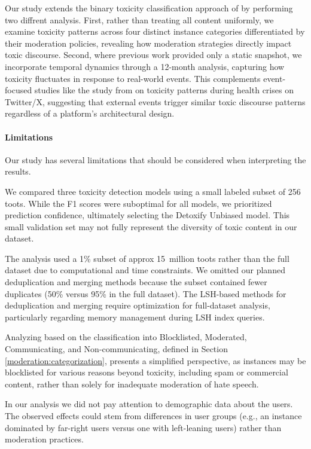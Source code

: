 Our study extends the binary toxicity classification approach of \citet{al-khateeb:2022} by performing two diffrent analysis. First, rather than treating all content uniformly, we examine toxicity patterns across four distinct instance categories differentiated by their moderation policies, revealing how moderation strategies directly impact toxic discourse. Second, where previous work provided only a static snapshot, we incorporate temporal dynamics through a 12-month analysis, capturing how toxicity fluctuates in response to real-world events. This complements event-focused studies like the study from \citet{fan:2022} on toxicity patterns during health crises on Twitter/X, suggesting that external events trigger similar toxic discourse patterns regardless of a platform's architectural design.

\paragraph{Limitations}
Our study has several limitations that should be considered when interpreting the results.

We compared three toxicity detection models using a small labeled subset of 256 toots. While the F1 scores were suboptimal for all models, we prioritized prediction confidence, ultimately selecting the Detoxify Unbiased model. This small validation set may not fully represent the diversity of toxic content in our dataset.

The analysis used a 1\% subset of approx 15~million toots rather than the full dataset due to computational and time constraints. We omitted our planned deduplication and merging methods because the subset contained fewer duplicates (50\% versus 95\% in the full dataset). The LSH-based methods for deduplication and merging require optimization for full-dataset analysis, particularly regarding memory management during LSH index queries.

Analyzing based on the classification into Blocklisted, Moderated, Communicating, and Non-communicating, defined in Section \ref{moderation:categorization}, presents a simplified perspective, as instances may be blocklisted for various reasons beyond toxicity, including spam or commercial content, rather than solely for inadequate moderation of hate speech.

In our analysis we did not pay attention to demographic data about the users. The observed effects could stem from differences in user groups (e.g., an instance dominated by far-right users versus one with left-leaning users) rather than moderation practices.

